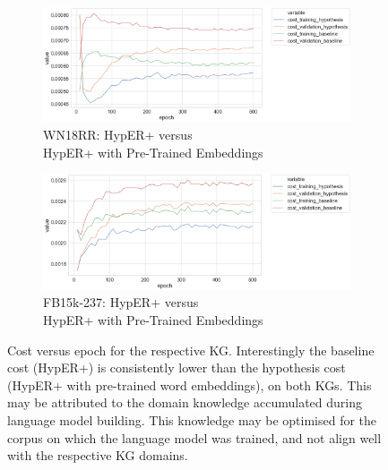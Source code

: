 \begin{figure}[H]
	\begin{subfigure}[b]{.5\linewidth}
   		\centering
    		\includegraphics[width=1.0\linewidth, height=0.6\linewidth]{WN18RR_Cost_Results_ptwv}
		\captionsetup{justification=centering}
		\caption{WN18RR: HypER+ versus \\ HypER+ with Pre-Trained Embeddings}
	\end{subfigure}
	\begin{subfigure}[b]{.5\linewidth}
   		\centering
		\includegraphics[width=1.0\linewidth, height=0.6\linewidth]{FB15k-237_Cost_Results_ptwv}
		\caption{FB15k-237: HypER+ versus \\ HypER+ with Pre-Trained Embeddings}
	\end{subfigure}
	\captionsetup{justification=centering}
	\caption{Cost versus epoch for the respective KG. Interestingly the baseline cost (HypER+) is consistently lower than the hypothesis cost (HypER+ with pre-trained word embeddings), on both KGs. This may be attributed to the domain knowledge accumulated during language model building. This knowledge may be optimised for the corpus on which the language model was trained, and not align well with the respective KG domains.}
\end{figure}


